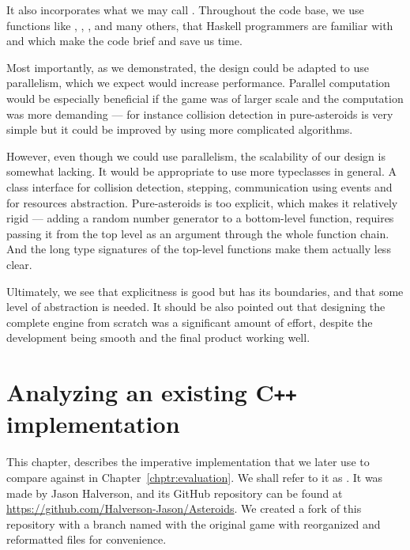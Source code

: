 \documentclass[
  digital, %
  color,   %
  table,   %
  oneside, %
  lof,     %
  lot,     %
]{fithesis3}
\newcommand{\cpp}{C\nolinebreak\texttt{+}\nolinebreak\texttt{+}}
\begin{document}
{It also incorporates what we may call .
Throughout the code base, we use functions like , ,
,  and many others, that Haskell programmers are familiar
with and which make the code brief and save us time.

Most importantly, as we demonstrated, the design could be adapted to
use parallelism, which we expect would increase performance.
Parallel computation would be especially beneficial if the game was of larger scale
and the computation was more demanding --- for instance collision detection
in pure-asteroids is very simple but it could be improved by using more
complicated algorithms.

However, even though we could use parallelism, the scalability of our design is somewhat lacking.
It would be appropriate to use more typeclasses in general. A class interface for
collision detection, stepping, communication using events and for resources abstraction.
Pure-asteroids is too explicit, which makes it relatively rigid
--- adding a random number
generator to a bottom-level function, requires passing it from the top level
as an argument through the whole function chain. And the long type signatures of the
top-level functions make them actually less clear.

Ultimately, we see that explicitness is good but has its boundaries,
and that some level of abstraction is needed. 
It should be also pointed out that designing the complete engine from scratch
was a significant amount of effort, despite the development being smooth and the final
product working well.





\chapter{Analyzing an existing \cpp{} implementation}
\label{chptr:impasteroids}

This chapter, describes the imperative implementation that we later
use to compare against in Chapter~\ref{chptr:evaluation}.
We shall refer to it as .
It was made by Jason Halverson, and its GitHub repository can be found at
\url{https://github.com/Halverson-Jason/Asteroids}. We created a fork of
this repository with a branch named \cite{impasteroidsrepo}
with the original game with reorganized and reformatted files for convenience.

}
\end{document}
